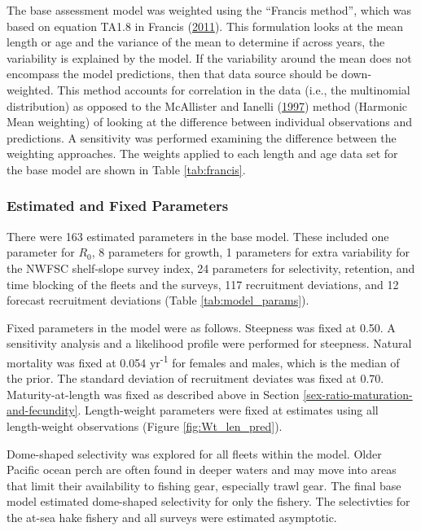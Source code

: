 \documentclass[12pt,]{article}
\begin{document}
The base assessment model was weighted using the ``Francis method'',
which was based on equation TA1.8 in Francis
(\protect\hyperlink{ref-francis_data_2011}{2011}). This formulation
looks at the mean length or age and the variance of the mean to
determine if across years, the variability is explained by the model. If
the variability around the mean does not encompass the model
predictions, then that data source should be down-weighted. This method
accounts for correlation in the data (i.e., the multinomial
distribution) as opposed to the McAllister and Ianelli
(\protect\hyperlink{ref-mcallister_bayesian_1997}{1997}) method
(Harmonic Mean weighting) of looking at the difference between
individual observations and predictions. A sensitivity was performed
examining the difference between the weighting approaches. The weights
applied to each length and age data set for the base model are shown in
Table \ref{tab:francis}.

\subsubsection{Estimated and Fixed
Parameters}\label{estimated-and-fixed-parameters}

There were 163 estimated parameters in the base model. These included
one parameter for \(R_0\), 8 parameters for growth, 1 parameters for
extra variability for the NWFSC shelf-slope survey index, 24 parameters
for selectivity, retention, and time blocking of the fleets and the
surveys, 117 recruitment deviations, and 12 forecast recruitment
deviations (Table \ref{tab:model_params}).

Fixed parameters in the model were as follows. Steepness was fixed at
0.50. A sensitivity analysis and a likelihood profile were performed for
steepness. Natural mortality was fixed at 0.054 yr\textsuperscript{-1}
for females and males, which is the median of the prior. The standard
deviation of recruitment deviates was fixed at 0.70. Maturity-at-length
was fixed as described above in Section
\ref{sex-ratio-maturation-and-fecundity}. Length-weight parameters were
fixed at estimates using all length-weight observations (Figure
\ref{fig:Wt_len_pred}).

Dome-shaped selectivity was explored for all fleets within the model.
Older Pacific ocean perch are often found in deeper waters and may move
into areas that limit their availability to fishing gear, especially
trawl gear. The final base model estimated dome-shaped selectivity for
only the fishery. The selectivties for the at-sea hake fishery and all
surveys were estimated asymptotic.
\end{document}
